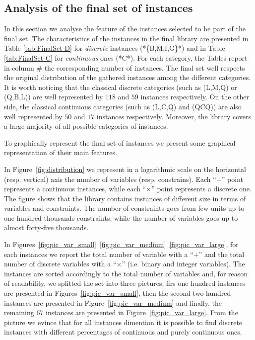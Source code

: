 \subsection{Analysis of the final set of instances}\label{subsec:final set}
In this section we analyse the feature of the instances selected to be
part of the final set.
The characteristics of the instances in the final library are
presented in Table \ref{tab:FinalSet-D} for \emph{discrete} instances
(*\{B,M,I,G\}*) and in Table \ref{tab:FinalSet-C} for
\emph{continuous} ones (*C*).
For each category, the Tables report in column $\#$ the corresponding
number of instances.
The final set well respects the original distribution of the gathered
instances among the different categories.
It is worth noticing that the classical discrete categories (such as
(L,M,Q) or (Q,B,L)) are well represented by $118$ and $59$  instances
respectively. On the other side, the classical continuous categories
(such as (L,C,Q) and (QCQ)) are also well represented by $50$ and $17$
 instances respectively.
Moreover, the library covers a large majority of all possible
categories of instances.

To graphically represent the final set of instances we present some
graphical representation of their main features.

In Figure~\ref{fig:distribution} we represent in a logarithmic scale
on the horizontal (resp. vertical) axis the number of variables (resp.
constrains).
Each  ``$+$'' point represents a continuous instances, while each
``$\times$'' point represents a discrete one. The figure shows that
the library contains instances of different size in terms of variables
and constraints. The number of constraints goes from few units up to
one hundred thousands constraints, while the number of variables goes
up to almost forty-five thousands.

In Figures~\ref{fig:pic_var_small}~\ref{fig:pic_var_medium}~\ref{fig:pic_var_large},
for each instances we report the total number of variable with a
``$+$'' and  the total number of discrete variables with a
``$\times$'' (i.e. binary and integer variables). The instances are
sorted accordingly to the total number of variables and, for reason of
readability, we splitted the set into three pictures, firs one hundred
instances are presented in Figures~\ref{fig:pic_var_small},
then the second two hundred instances are presented in
Figure~\ref{fig:pic_var_medium} and finally, the remaining $67$
instances are presented in Figure~\ref{fig:pic_var_large}.
From the picture we evince that for all instances dimention it is
possible to find discrete instances with different percentages of
continuous and purely continuous ones.



